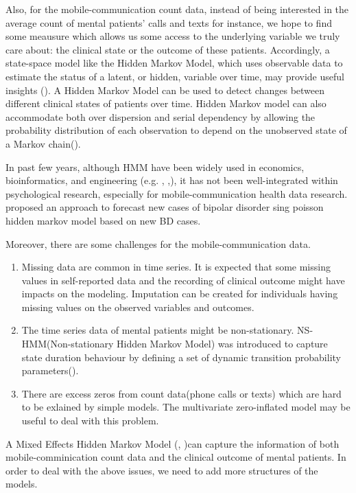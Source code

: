 \documentclass[12pt]{article}
\numberwithin{equation}{section}
\begin{document}
Also, for the mobile-communication count data, instead of being interested in the average count of mental patients' calls and texts for instance, we hope to find some meausure which allows us some access to the underlying variable we truly care about: the clinical state or the outcome of these patients.  Accordingly, a state-space model like the Hidden Markov Model, which uses observable data to estimate the status of a latent, or hidden, variable over time, may provide useful insights (\citet{reece2017forecasting}).  A Hidden Markov Model can be used to detect changes between different clinical states of patients over time. Hidden Markov model can also accommodate both over dispersion and serial dependency by allowing the probability distribution of each observation to depend on the unobserved state of a Markov chain(\citet{zucchini2017hidden}).

In past few years, although HMM have been widely used in economics, bioinformatics, and engineering (e.g. \citet{macdonald1997hidden}, \citet{durbin1998biological},\citet{rabiner1989tutorial}), it has not been well-integrated within psychological research, especially for mobile-communication health data research. \citet{alafchi2018forecasting} proposed an approach to forecast new cases of bipolar disorder sing poisson hidden markov model based on new BD cases. 

Moreover, there are some challenges for the mobile-communication data.
\begin{enumerate}
	\item Missing data are common in time series. It is expected that some missing values in self-reported data and the recording of clinical outcome might have impacts on the modeling. Imputation can be created for individuals having missing values on the observed variables and outcomes. 
	\item The time series data of mental patients might be non-stationary. NS-HMM(Non-stationary Hidden Markov Model) was introduced to capture state duration behaviour by defining a set of dynamic transition probability parameters(\citet{mor2020systematic}).
	\item There are excess zeros from count data(phone calls or texts) which are hard to be exlained by simple models. The multivariate zero-inflated model may be useful to deal with this problem.
\end{enumerate}


A Mixed Effects Hidden Markov Model (\citet{altman2007mixed}, \citet{maruotti2012mixed})can capture the information of both mobile-comminication count data and the clinical outcome of mental patients. In order to deal with the above issues, we need to add more structures of the models.
\end{document}
